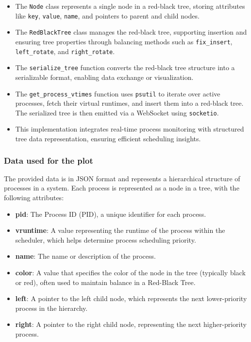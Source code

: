 \documentclass[12pt]{article}
\begin{document}
\begin{itemize}
    \item The \texttt{Node} class represents a single node in a red-black tree, storing attributes like \texttt{key}, \texttt{value}, \texttt{name}, and pointers to parent and child nodes.
    \item The \texttt{RedBlackTree} class manages the red-black tree, supporting insertion and ensuring tree properties through balancing methods such as \texttt{fix\_insert}, \texttt{left\_rotate}, and \texttt{right\_rotate}.
    \item The \texttt{serialize\_tree} function converts the red-black tree structure into a serializable format, enabling data exchange or visualization.
    \item The \texttt{get\_process\_vtimes} function uses \texttt{psutil} to iterate over active processes, fetch their virtual runtimes, and insert them into a red-black tree. The serialized tree is then emitted via a WebSocket using \texttt{socketio}.
    \item This implementation integrates real-time process monitoring with structured tree data representation, ensuring efficient scheduling insights.
\end{itemize}
\subsubsection{Data used for the plot}
The provided data is in JSON format and represents a hierarchical structure of processes in a system. Each process is represented as a node in a tree, with the following attributes:

\begin{itemize}
    \item \textbf{pid}: The Process ID (PID), a unique identifier for each process.
    \item \textbf{vruntime}: A value representing the runtime of the process within the scheduler, which helps determine process scheduling priority.
    \item \textbf{name}: The name or description of the process.
    \item \textbf{color}: A value that specifies the color of the node in the tree (typically black or red), often used to maintain balance in a Red-Black Tree.
    \item \textbf{left}: A pointer to the left child node, which represents the next lower-priority process in the hierarchy.
    \item \textbf{right}: A pointer to the right child node, representing the next higher-priority process.
\end{itemize}
\end{document}
